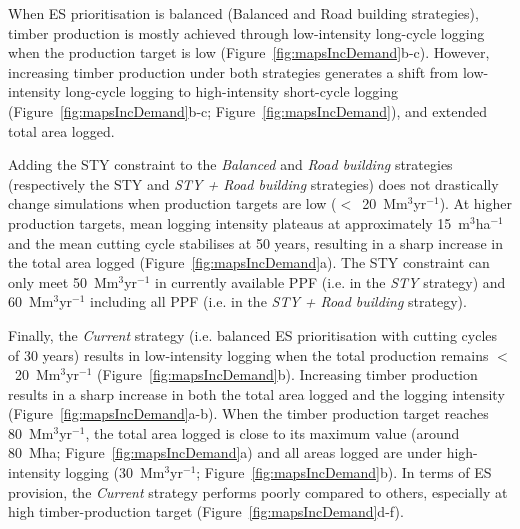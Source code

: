\documentclass{article}
\begin{document}
When ES prioritisation is balanced (Balanced and Road building strategies), timber production is mostly achieved through low-intensity long-cycle logging when the production target is low (Figure~\ref{fig:mapsIncDemand}b-c). However, increasing timber production under both strategies generates a shift from low-intensity long-cycle logging to high-intensity short-cycle logging (Figure~\ref{fig:mapsIncDemand}b-c; Figure~\ref{fig:mapsIncDemand}), and extended total area logged.

Adding the STY constraint to the \textit{Balanced} and \textit{Road building} strategies (respectively the STY and \textit{STY + Road building} strategies) does not drastically change simulations when production targets are low ($<$~20~Mm$^3$yr$^{-1}$). At higher production targets, mean logging intensity plateaus at approximately 15~m$^3$ha$^{-1}$ and the mean cutting cycle stabilises at 50 years, resulting in a sharp increase in the total area logged (Figure~\ref{fig:mapsIncDemand}a). The STY constraint can only meet 50~Mm$^3$yr$^{-1}$ in currently available PPF (i.e. in the \textit{STY} strategy) and 60~Mm$^3$yr$^{-1}$ including all PPF (i.e. in the \textit{STY + Road building} strategy).

Finally, the \textit{Current} strategy (i.e. balanced ES prioritisation with cutting cycles of 30 years) results in low-intensity logging when the total production remains $<$~20~Mm$^3$yr$^{-1}$ (Figure~\ref{fig:mapsIncDemand}b). Increasing timber production results in a sharp increase in both the total area logged and the logging intensity (Figure~\ref{fig:mapsIncDemand}a-b). When the timber production target reaches 80~Mm$^3$yr$^{-1}$, the total area logged is close to its maximum value (around 80~Mha; Figure~\ref{fig:mapsIncDemand}a) and all areas logged are under high-intensity logging (30~Mm$^3$yr$^{-1}$; Figure~\ref{fig:mapsIncDemand}b). In terms of ES provision, the \textit{Current} strategy performs poorly compared to others, especially at high timber-production target (Figure~\ref{fig:mapsIncDemand}d-f).
\end{document}
